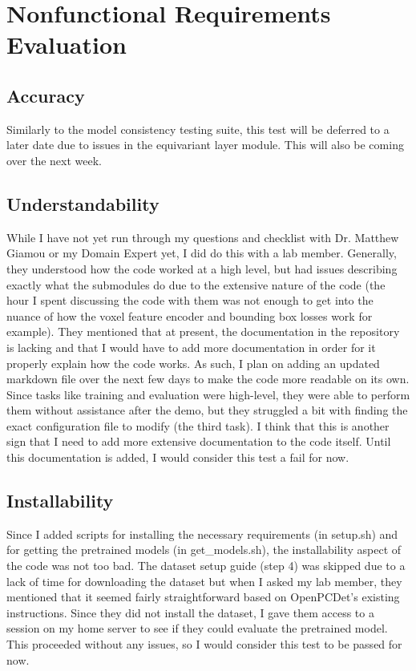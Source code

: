 \documentclass[12pt, titlepage]{article}
\begin{document}
\section{Nonfunctional Requirements Evaluation}



\subsection{Accuracy}

Similarly to the model consistency testing suite, this test will be deferred to a later date due to issues in the equivariant layer module. This will also be coming over the next week.
		
\subsection{Understandability}

While I have not yet run through my questions and checklist with Dr. Matthew Giamou or my Domain Expert yet, I did do this with a lab member. Generally, they understood how the code worked at a high level,
 but had issues describing exactly what the submodules do due to the extensive nature of the code (the hour I spent discussing the code with them was not enough to get into the nuance of how the voxel feature encoder and bounding box losses work for example). 
They mentioned that at present, the documentation in the repository is lacking and that I would have to add more documentation in order for it properly explain how the code works. As such, I plan on adding an updated markdown file over the next few days to make 
the code more readable on its own. Since tasks like training and evaluation were high-level, they were able to perform them without assistance after the demo, but they struggled a bit with finding the exact configuration file to modify (the third task). I think that 
this is another sign that I need to add more extensive documentation to the code itself. Until this documentation is added, I would consider this test a fail for now.

\subsection{Installability}

Since I added scripts for installing the necessary requirements (in setup.sh) and for getting the pretrained models (in get\_models.sh), the installability aspect of the code was not too bad. The dataset setup guide (step 4) was skipped due to a lack of time for downloading the 
dataset but when I asked my lab member, they mentioned that it seemed fairly straightforward based on OpenPCDet's existing instructions. Since they did not install the dataset, I gave them access to a session on my home server to see if they could evaluate the pretrained model. 
This proceeded without any issues, so I would consider this test to be passed for now.
\end{document}

